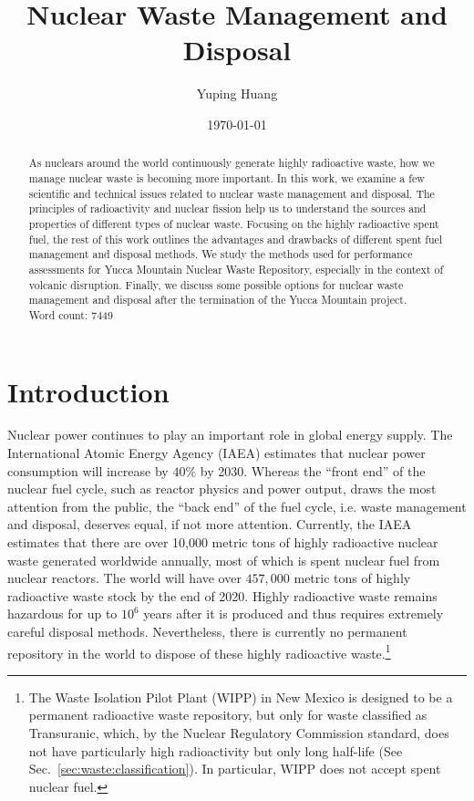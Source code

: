 \documentclass[nofootinbib,preprint,aps]{revtex4-1}
\begin{document}
\title{Nuclear Waste Management and Disposal}

\author{Yuping Huang}%

\date{\today}%
\begin{abstract}
    As nuclears around the world continuously generate highly radioactive waste,
    how we manage nuclear waste is becoming more important. In this work,
    we examine a few scientific and technical issues related to nuclear waste management and disposal.
    The principles of radioactivity and nuclear fission help us to understand the sources and properties
    of different types of nuclear waste. Focusing on the highly radioactive spent fuel, the rest
    of this work outlines the advantages and drawbacks of different spent fuel management and disposal
    methods. We study the methods used for performance assessments for Yucca Mountain Nuclear Waste Repository,
    especially in the context of volcanic disruption. Finally, we discuss some possible options for 
    nuclear waste management and disposal after
    the termination of the Yucca Mountain project.\\
    Word count: 7449\\
\end{abstract}
\maketitle
\tableofcontents
\newpage
\section{Introduction}
Nuclear power continues to play an important role in global energy supply.
The International Atomic Energy Agency (IAEA) estimates that nuclear power
consumption will increase by $40\%$ by 2030.\cite{iaea12}
Whereas the ``front end'' of the nuclear fuel cycle, such as reactor physics and power output, draws
the most attention from the public, the ``back end'' of the fuel cycle, i.e. waste management and
disposal, deserves equal, if not more attention.
Currently, the IAEA estimates that there are over 10,000 metric tons of highly radioactive nuclear waste 
generated worldwide annually,
most of which is spent nuclear fuel from nuclear reactors.\cite{iaea08, r12}
The world will have over $457,000$ metric tons of highly radioactive waste stock by the end of 2020.\cite{r12}
Highly radioactive waste remains hazardous for up to $10^6$ years after it is produced and thus
requires extremely careful disposal methods.
Nevertheless, there is currently no permanent repository in the world to dispose of these highly radioactive
waste.\footnote{The Waste Isolation Pilot Plant (WIPP) in New Mexico is designed to be a permanent radioactive
    waste repository, but only
for waste classified as Transuranic, which, by the Nuclear Regulatory Commission standard, does not have particularly
high radioactivity but only long half-life (See Sec.~\ref{sec:waste:classification}). In particular, WIPP does not accept spent nuclear
fuel.}  
\end{document}
